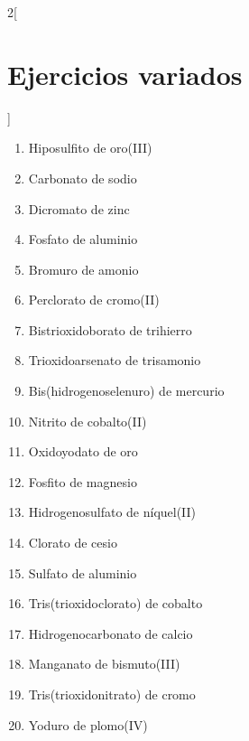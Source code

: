 \documentclass[10pt]{article}
\begin{document}
\begin{multicols*}{2}[
  \section{Ejercicios variados}
  ]
\begin{exercise}[
    tags    = {inorgánica,sales, sales ternarias, oxosales,2B},
    topics  = {química inorgánica,formulación,nomenclatura},
    source  = {Química 2B OXF 2016, p347, e12},
  ]
  \begin{enumerate}
    \item Hiposulfito de oro(III)
    \item Carbonato de sodio
    \item Dicromato de zinc
    \item Fosfato de aluminio
    \item Bromuro de amonio
    \item Perclorato de cromo(II)
    \item Bistrioxidoborato de trihierro
    \item Trioxidoarsenato de trisamonio
    \item Bis(hidrogenoselenuro) de mercurio
    \item Nitrito de cobalto(II)
    \item Oxidoyodato de oro
    \item Fosfito de magnesio
    \item Hidrogenosulfato de níquel(II)
    \item Clorato de cesio
    \item Sulfato de aluminio
    \item Tris(trioxidoclorato) de cobalto
    \item Hidrogenocarbonato de calcio
    \item Manganato de bismuto(III)
    \item Tris(trioxidonitrato) de cromo
    \item Yoduro de plomo(IV)
  \end{enumerate}
\end{exercise}


\end{multicols*}

\newpage
\end{document}
